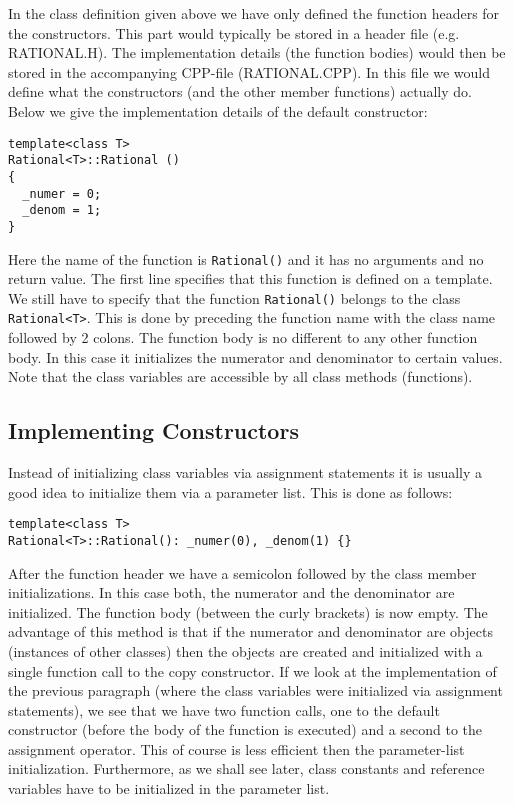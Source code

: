 In the class definition given above we have only defined the function headers
for the constructors. This part would typically be stored in a header file (e.g. RATIONAL.H).
The implementation details (the function bodies) would then be stored in the accompanying
CPP-file (RATIONAL.CPP). In this file we would define what the constructors (and the
other member functions) actually do. Below we give the implementation details of the
default constructor:
{\footnotesize \begin{verbatim}
template<class T>
Rational<T>::Rational ()
{
  _numer = 0;
  _denom = 1;
}
\end{verbatim}}
Here the name of the function is \verb+Rational()+ and it has no arguments and no return
value. The first line specifies that this function is defined on a template. We still have to
specify that the function \verb+Rational()+ belongs to the class \verb+Rational<T>+. This
is done by preceding the function name with the class name followed by 2 colons.
The function body is no different to any other function body. In this case it initializes
the numerator and denominator to certain values. Note that the class variables are
accessible by all class methods (functions).


\subsection{Implementing Constructors}

Instead of initializing class variables via assignment statements it is usually a good idea
to initialize them via a parameter list. This is done as follows:
{\footnotesize \begin{verbatim}
template<class T>
Rational<T>::Rational(): _numer(0), _denom(1) {}
\end{verbatim}}
After the function header we have a semicolon followed by the class member initializations.
In this case both, the numerator and the denominator are initialized. The function body
(between the curly brackets) is now empty. The advantage of this method is
that if the numerator and denominator are objects (instances of other classes) then
the objects are created and initialized with a single function call to the copy constructor.
If we look at the implementation of the previous paragraph (where the class variables
were initialized via assignment statements), we see that we have two function calls,
one to the default constructor (before the body of the function is executed) and a
second to the assignment operator. This of course is less efficient then the parameter-list
initialization. Furthermore, as we shall see later, class constants and reference variables
have to be initialized in the parameter list.

